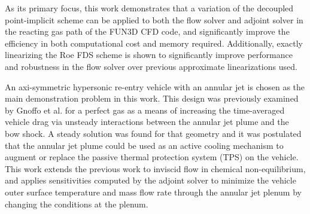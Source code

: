 As its primary focus, this work demonstrates that a variation of the decoupled
point-implicit scheme can be applied to both the flow solver and adjoint solver
in the reacting gas path of the FUN3D CFD code, and significantly improve the
efficiency in both computational cost and memory required.  Additionally,
exactly linearizing the Roe FDS scheme is shown to significantly improve
performance and robustness in the flow solver over previous approximate
linearizations used\cite{gnoffo-tp}.

An axi-symmetric hypersonic re-entry vehicle with an annular jet is chosen as
the main demonstration problem in this work.  This design was previously
examined by Gnoffo et al.\cite{gnoffo2016tapping} for a perfect gas as a means
of increasing the time-averaged vehicle drag via unsteady interactions between
the annular jet plume and the bow shock.  A steady solution was found for that
geometry and it was postulated that the annular jet plume could be used as an
active cooling mechanism to augment or replace the passive thermal protection
system (TPS) on the vehicle.  This work extends the previous work to inviscid
flow in chemical non-equilibrium, and applies sensitivities computed by the
adjoint solver to minimize the vehicle outer surface temperature and mass flow
rate through the annular jet plenum by changing the conditions at the plenum.

